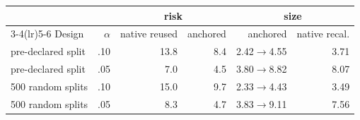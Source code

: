\begin{tabular}{@{}lrrrrr@{}}
\toprule
& & \multicolumn{2}{c}{risk} & \multicolumn{2}{c}{size} \\
\cmidrule(lr){3-4}\cmidrule(lr){5-6}
Design & $\alpha$ & native reused & anchored & anchored & native recal. \\
\midrule
pre-declared split & .10 & 13.8 & 8.4 & 2.42$\to$4.55 & 3.71 \\
pre-declared split & .05 & 7.0 & 4.5 & 3.80$\to$8.82 & 8.07 \\
500 random splits & .10 & 15.0 & 9.7 & 2.33$\to$4.43 & 3.49 \\
500 random splits & .05 & 8.3 & 4.7 & 3.83$\to$9.11 & 7.56 \\
\bottomrule
\end{tabular}
